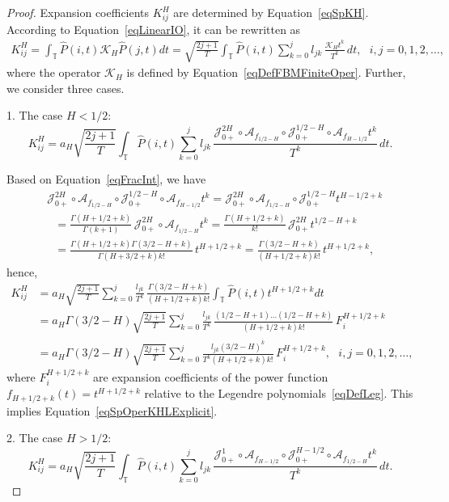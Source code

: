 \documentclass[10pt,a4paper]{amsart}
\newcommand{\ca}{\mathcal{A}}
\newcommand{\cj}{\mathcal{J}}
\newcommand{\ck}{\mathcal{K}}
\begin{document}
\begin{proof}
Expansion coefficients $K_{ij}^H$ are determined by Equation~\eqref{eqSpKH}. According to Equation~\eqref{eqLinearIO}, it can be rewritten as
\begin{align*}
  K_{ij}^H = \int_\mathds{T} \hat P(i,t) \ck_H \hat P(j,t) dt = \sqrt{\frac{2j+1}{T}} \int_\mathds{T} {\hat P(i,t) \sum\limits_{k=0}^j {l_{jk} \, \frac{\ck_H t^k}{T^k}} \, dt}, \ \ \ i,j = 0,1,2,\dots,
\end{align*}
where the operator $\ck_H$ is defined by Equation~\eqref{eqDefFBMFiniteOper}. Further, we consider three cases.

1. The case $H < 1/2$:
\[
  K_{ij}^H = a_H \sqrt{\frac{2j+1}{T}} \int_\mathds{T} {\hat P(i,t) \sum\limits_{k=0}^j {l_{jk} \, \frac{\cj_{0+}^{2H} \circ \ca_{f_{1/2-H}} \circ \cj_{0+}^{1/2-H} \circ \ca_{f_{H-1/2}} t^k}{T^k}} \, dt}.
\]

Based on Equation~\eqref{eqFracInt}, we have
\begin{align*}
  & \cj_{0+}^{2H} \circ \ca_{f_{1/2-H}} \circ \cj_{0+}^{1/2-H} \circ \ca_{f_{H-1/2}} t^k = \cj_{0+}^{2H} \circ \ca_{f_{1/2-H}} \circ \cj_{0+}^{1/2-H} t^{H-1/2+k} \\
  & \ \ \ = \frac{\Gamma(H+1/2+k)}{\Gamma(k+1)} \, \cj_{0+}^{2H} \circ \ca_{f_{1/2-H}} t^k = \frac{\Gamma(H+1/2+k)}{k!} \, \cj_{0+}^{2H} t^{1/2-H+k} \\
  & \ \ \ = \frac{\Gamma(H+1/2+k) \Gamma(3/2-H+k)}{\Gamma(H+3/2+k) k!} \, t^{H+1/2+k} = \frac{\Gamma(3/2-H+k)}{(H+1/2+k) k!} \, t^{H+1/2+k},
\end{align*}
hence,
\begin{align*}
  K_{ij}^H & = a_H \sqrt{\frac{2j+1}{T}} \sum\limits_{k=0}^j \frac{l_{jk}}{T^k} \, \frac{\Gamma(3/2-H+k)}{(H+1/2+k) k!} \int_\mathds{T} {\hat P(i,t) t^{H+1/2+k} dt} \\
  & = a_H \Gamma(3/2-H) \sqrt{\frac{2j+1}{T}} \sum\limits_{k=0}^j \frac{l_{jk}}{T^k} \, \frac{(1/2-H+1) \ldots (1/2-H+k)}{(H+1/2+k) k!} \, F_i^{H+1/2+k} \\
  & = a_H \Gamma(3/2-H) \sqrt{\frac{2j+1}{T}} \sum\limits_{k=0}^j \frac{l_{jk} (3/2-H)^{\overline{k}}}{T^k (H+1/2+k) k!} \, F_i^{H+1/2+k}, \ \ \ i,j = 0,1,2,\dots,
\end{align*}
where $F_i^{H+1/2+k}$ are expansion coefficients of the power function $f_{H+1/2+k}(t) = t^{H+1/2+k}$ relative to the Legendre polynomials~\eqref{eqDefLeg}. This implies Equation~\eqref{eqSpOperKHLExplicit}.

2. The case $H > 1/2$:
\[
  K_{ij}^H = a_H \sqrt{\frac{2j+1}{T}} \int_\mathds{T} {\hat P(i,t) \sum\limits_{k=0}^j {l_{jk} \, \frac{\cj_{0+}^1 \circ \ca_{f_{H-1/2}} \circ \cj_{0+}^{H-1/2} \circ \ca_{f_{1/2-H}} t^k}{T^k}} \, dt}.
\]


\end{proof}
\end{document}
